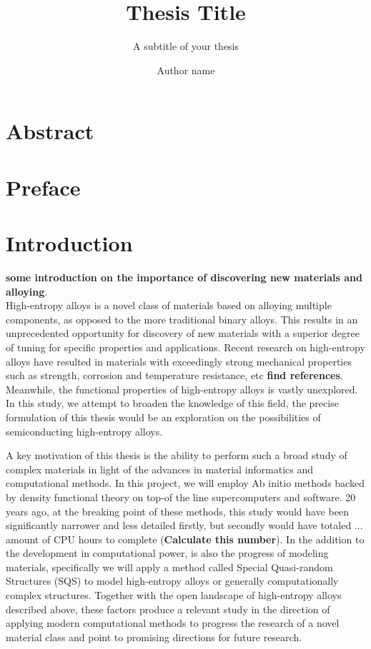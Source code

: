 \documentclass[UKenglish]{ifimaster}  %
\title{Thesis Title}        %
\subtitle{A subtitle of your thesis }         %
\author{Author name}                      %
\begin{document}
\duoforside[dept={Department Name <change at main.tex>},   %
  program={Master's Program Name <change at main.tex>},  %
  long]                                        %

\frontmatter{}  
\chapter*{Abstract}                   %

\tableofcontents{}
\listoffigures{}
\listoftables{}

\chapter*{Preface}                    %

\mainmatter{}

\chapter{Introduction}                  %

\textbf{some introduction on the importance of discovering new materials and alloying}.\\

High-entropy alloys is a novel class of materials based on alloying multiple components, as opposed to the more traditional binary alloys. This results in an unprecedented opportunity for discovery of new materials with a superior degree of tuning for specific properties and applications. Recent research on high-entropy alloys have resulted in materials with exceedingly strong mechanical properties such as strength, corrosion and temperature resistance, etc \textbf{find references}. Meanwhile, the functional properties of high-entropy alloys is vastly unexplored. In this study, we attempt to broaden the knowledge of this field, the precise formulation of this thesis would be an exploration on the possibilities of semiconducting high-entropy alloys. 

A key motivation of this thesis is the ability to perform such a broad study of complex materials in light of the advances in material informatics and computational methods. In this project, we will employ Ab initio methods backed by density functional theory on top-of the line supercomputers and software. 20 years ago, at the breaking point of these methods, this study would have been significantly narrower and less detailed firstly, but secondly would have totaled ... amount of CPU hours to complete (\textbf{Calculate this number}). In the addition to the development in computational power, is also the progress of modeling materials, specifically we will apply a method called Special Quasi-random Structures (SQS) to model high-entropy alloys or generally computationally complex structures. Together with the open landscape of high-entropy alloys described above, these factors produce a relevant study in the direction of applying modern computational methods to progress the research of a novel material class and point to promising directions for future research.   
 
\end{document}
